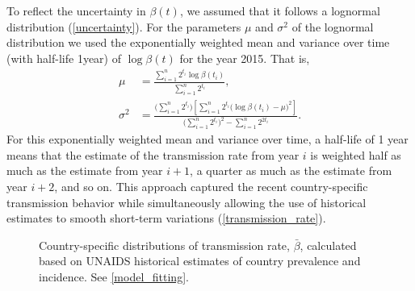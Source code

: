 \documentclass{article}
\begin{document}
To reflect the uncertainty in $\beta(t)$, we assumed that it follows a
lognormal distribution (\autoref{uncertainty}). For the parameters
$\mu$ and $\sigma^2$ of the lognormal distribution we used the
exponentially weighted mean and variance \cite{holt2004} over time
(with half-life 1\;year) of $\log \beta(t)$ for the year 2015.  That
is,
\begin{equation}
  \label{lognormal_params}
  \begin{split}
    \mu &= \frac{\sum_{i = 1}^n  2^{t_i}
      \log \beta(t_i)}
    {\sum_{i = 1}^n 2^{t_i}},
    \\
    \sigma^2 &= \frac{\big(\sum_{i = 1}^n 2^{t_i}\big)
      \left[\sum_{i = 1}^n  2^{t_i}
        \big(\log \beta(t_i) - \mu\big)^2\right]}
    {\big(\sum_{i = 1}^n 2^{t_i}\big)^2
      - \sum_{i = 1}^n 2^{2 t_i}}.
  \end{split}
\end{equation}
For this exponentially weighted mean and variance over time, a
half-life of 1 year means that the estimate of the transmission rate
from year $i$ is weighted half as much as the estimate from year
$i + 1$, a quarter as much as the estimate from year $i + 2$, and so
on.  This approach captured the recent country-specific transmission
behavior while simultaneously allowing the use of historical estimates
to smooth short-term variations (\autoref{transmission_rate}).

\begin{figure}
  \begin{center}
    
  \end{center}
  \caption{Country-specific distributions of transmission rate,
    $\bar{\beta}$, calculated based on UNAIDS historical estimates of
    country prevalence and incidence.  See \autoref{model_fitting}.}
  \label{transmission_rate}
\end{figure}
\end{document}
